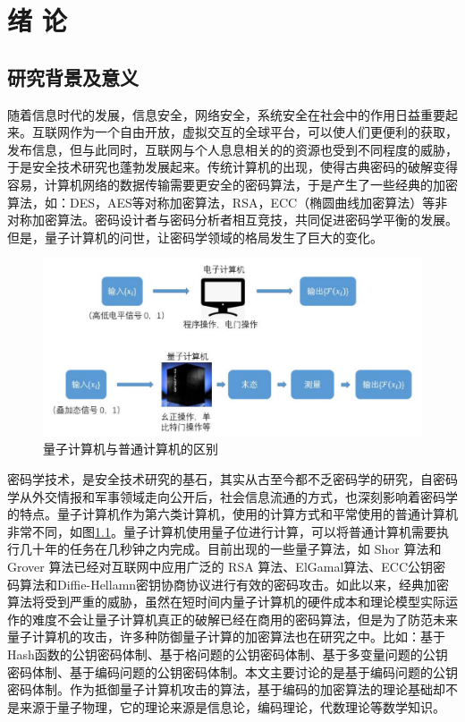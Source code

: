 \chapter{绪\hskip 0.4cm 论}
\label{chap1}

\section{研究背景及意义}
随着信息时代的发展，信息安全，网络安全，系统安全在社会中的作用日益重要起来。互联网作为一个自由开放，虚拟交互的全球平台，可以使人们更便利的获取，发布信息，但与此同时，互联网与个人息息相关的的资源也受到不同程度的威胁，于是安全技术研究也蓬勃发展起来。传统计算机的出现，使得古典密码的破解变得容易，计算机网络的数据传输需要更安全的密码算法，于是产生了一些经典的加密算法，如：DES，AES等对称加密算法，RSA，ECC（椭圆曲线加密算法）等非对称加密算法。密码设计者与密码分析者相互竞技，共同促进密码学平衡的发展。但是，量子计算机的问世，让密码学领域的格局发生了巨大的变化。

\begin{figure}[H]
	\centering
	\includegraphics[width=15 cm]{fig/quantum.pdf}
	\caption{量子计算机与普通计算机的区别} %
	\label{fig:quantum_pdf}
\end{figure}

密码学技术，是安全技术研究的基石，其实从古至今都不乏密码学的研究，自密码学从外交情报和军事领域走向公开后，社会信息流通的方式，也深刻影响着密码学的特点。量子计算机作为第六类计算机，使用的计算方式和平常使用的普通计算机非常不同，如图\ref{fig:quantum_pdf}。量子计算机使用量子位进行计算，可以将普通计算机需要执行几十年的任务在几秒钟之内完成。目前出现的一些量子算法，如 Shor 算法\cite{Shor1994Algorithms}和 Grover 算法\cite{Grover1996Fast}已经对互联网中应用广泛的 RSA 算法、ElGamal算法、ECC公钥密码算法和Diffie-Hellamn密钥协商协议进行有效的密码攻击。如此以来，经典加密算法将受到严重的威胁，虽然在短时间内量子计算机的硬件成本和理论模型实际运作的难度不会让量子计算机真正的破解已经在商用的密码算法，但是为了防范未来量子计算机的攻击，许多种防御量子计算的加密算法也在研究之中。比如：基于Hash函数的公钥密码体制、基于格问题的公钥密码体制、基于多变量问题的公钥密码体制、基于编码问题的公钥密码体制。本文主要讨论的是基于编码问题的公钥密码体制。作为抵御量子计算机攻击的算法，基于编码的加密算法的理论基础却不是来源于量子物理，它的理论来源是信息论，编码理论，代数理论等数学知识。

